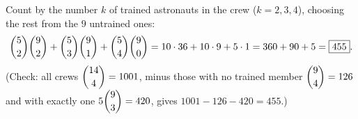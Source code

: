 Count by the number $k$ of trained astronauts in the crew ($k=2,3,4$), choosing the rest from the $9$ untrained ones:
\[
\dbinom52\dbinom92+\dbinom53\dbinom91+\dbinom54\dbinom90=10\cdot36+10\cdot9+5\cdot1=360+90+5=\boxed{455}.
\]
(Check: all crews $\dbinom{14}4=1001$, minus those with no trained member $\dbinom94=126$ and with exactly one $5\dbinom93=420$, gives $1001-126-420=455$.)
